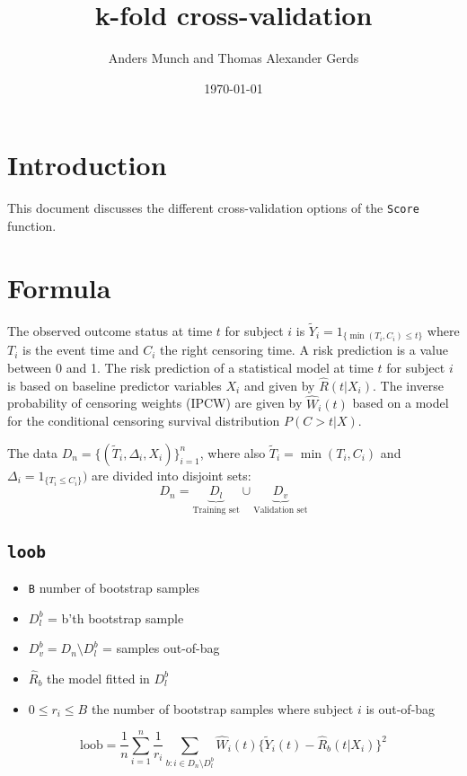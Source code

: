 \documentclass{article}
\author{Anders Munch and Thomas Alexander Gerds}
\affil{University of Copenhagen, Department of Public Health, Section of Biostatistics, Copenhagen, Denmark}
\date{\today}
\title{k-fold cross-validation}
\begin{document}
\maketitle

\section{Introduction}
\label{sec:orgce8d327}

This document discusses the different cross-validation options of the
\texttt{Score} function.

\section{Formula}
\label{sec:orgdd3b9ce}

The observed outcome status at time \(t\) for subject \(i\) is
\(\tilde Y_i=1_{\{\min(T_i,C_i)\le t\}}\) where \(T_i\) is the event
time and \(C_i\) the right censoring time. A risk prediction is a
value between 0 and 1. The risk prediction of a statistical model at
time \(t\) for subject \(i\) is based on baseline predictor variables
\(X_i\) and given by \(\hat R(t|X_i)\). The inverse probability of
censoring weights (IPCW) are given by \(\hat W_i(t)\) based on a model for
the conditional censoring survival distribution \(P(C> t|X)\).

The data \(D_n=\{(\tilde T_i,\Delta_i,X_i)\}_{i=1}^n\), where also
\(\tilde T_i=\min (T_i,C_i)\) and \(\Delta_i=1_{\{T_i\le C_i\}})\) are
divided into disjoint sets:
\begin{equation*}
D_n = \underbrace{D_l}_{\text{Training set}} \cup \underbrace{D_v}_{\text{Validation set}}
\end{equation*}

\subsection{\texttt{loob}}
\label{sec:orga7ecde7}

\begin{itemize}
\item \texttt{B} number of bootstrap samples
\item \(D_l^b\) = b'th bootstrap sample
\item \(D_v^b=D_n \setminus D_l^b\)  = samples out-of-bag
\item \(\hat R_b\) the model fitted in \(D_l^b\)
\item \(0\le r_i \le B\) the number of bootstrap samples where subject \(i\) is out-of-bag
\end{itemize}
\begin{equation*}
\text{loob}=\frac 1 n \sum_{i=1}^n\frac{1}{r_i}
\sum_{b: i\in D_n\setminus D^b_l}\hat W_i(t) \{\tilde Y_i(t)-\hat
R_b(t|X_i)\}^2
\end{equation*}
\end{document}
